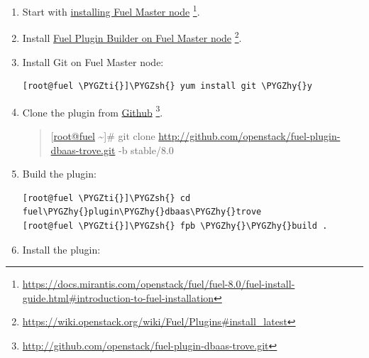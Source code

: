 \documentclass[letterpaper,10pt,english]{sphinxmanual}
\def\PYGZsh{\char`\#}
\def\PYGZhy{\char`\-}
\def\PYGZti{\char`\~}
\begin{document}
\label{installation_guide:installation}\label{installation_guide::doc}\label{installation_guide:installation-guide}\begin{enumerate}
\item {} 
Start with \href{https://docs.mirantis.com/openstack/fuel/fuel-8.0/fuel-install-guide.html\#introduction-to-fuel-installation}{installing Fuel Master node} \footnote{
\href{https://docs.mirantis.com/openstack/fuel/fuel-8.0/fuel-install-guide.html\#introduction-to-fuel-installation}{https://docs.mirantis.com/openstack/fuel/fuel-8.0/fuel-install-guide.html\#introduction-to-fuel-installation}
}.

\item {} 
Install \href{https://wiki.openstack.org/wiki/Fuel/Plugins\#install\_latest}{Fuel Plugin Builder on Fuel Master node} \footnote{
\href{https://wiki.openstack.org/wiki/Fuel/Plugins\#install\_latest}{https://wiki.openstack.org/wiki/Fuel/Plugins\#install\_latest}
}.

\item {} 
Install Git on Fuel Master node:

\begin{Verbatim}[commandchars=\\\{\}]
[root@fuel \PYGZti{}]\PYGZsh{} yum install git \PYGZhy{}y
\end{Verbatim}

\item {} 
Clone the plugin from \href{http://github.com/openstack/fuel-plugin-dbaas-trove.git}{Github} \footnote{
\href{http://github.com/openstack/fuel-plugin-dbaas-trove.git}{http://github.com/openstack/fuel-plugin-dbaas-trove.git}
}.
\begin{quote}

{[}\href{mailto:root@fuel}{root@fuel} \textasciitilde{}{]}\# git clone \href{http://github.com/openstack/fuel-plugin-dbaas-trove.git}{http://github.com/openstack/fuel-plugin-dbaas-trove.git} -b stable/8.0
\end{quote}

\item {} 
Build the plugin:

\begin{Verbatim}[commandchars=\\\{\}]
[root@fuel \PYGZti{}]\PYGZsh{} cd fuel\PYGZhy{}plugin\PYGZhy{}dbaas\PYGZhy{}trove
[root@fuel \PYGZti{}]\PYGZsh{} fpb \PYGZhy{}\PYGZhy{}build .
\end{Verbatim}

\item {} 
Install the plugin:


\end{enumerate}
\end{document}
